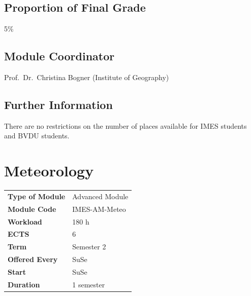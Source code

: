 \documentclass[
  letterpaper,
  10pt,
  openany]{book}
\begin{document}
\section*{Proportion of Final Grade}\label{proportion-of-final-grade-3}


5\%

\section*{Module Coordinator}\label{module-coordinator-3}


Prof.~Dr.~Christina Bogner (Institute of Geography)

\section*{Further Information}\label{further-information-3}


There are no restrictions on the number of places available for IMES
students and BVDU students.

\chapter*{Meteorology}\label{meteorology}


\begin{longtable}[]{@{}ll@{}}
\toprule\noalign{}
\endhead
\bottomrule\noalign{}
\endlastfoot
\textbf{Type of Module} & Advanced Module \\
\textbf{Module Code} & IMES-AM-Meteo \\
\textbf{Workload} & 180 h \\
\textbf{ECTS} & 6 \\
\textbf{Term} & Semester 2 \\
\textbf{Offered Every} & SuSe \\
\textbf{Start} & SuSe \\
\textbf{Duration} & 1 semester \\
\end{longtable}
\end{document}
